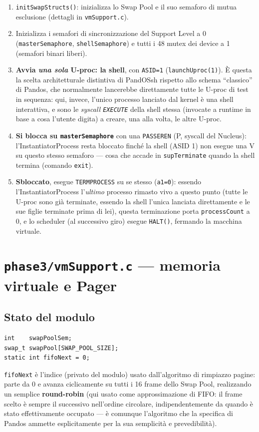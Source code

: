 \documentclass[11pt,a4paper]{article}
\newcommand{\code}[1]{\texttt{#1}}
\begin{document}
\begin{enumerate}
\item \code{initSwapStructs()}: inizializza lo Swap Pool e il suo semaforo
  di mutua esclusione (dettagli in \code{vmSupport.c}).
\item Inizializza i semafori di sincronizzazione del Support Level a 0
  (\code{masterSemaphore}, \code{shellSemaphore}) e tutti i 48 mutex dei
  device a 1 (semafori binari liberi).
\item \textbf{Avvia \emph{una sola} U-proc: la shell}, con \code{ASID=1}
  (\code{launchUproc(1)}). \`E questa la scelta architetturale distintiva
  di PandOSsh rispetto allo schema ``classico'' di Pandos, che normalmente
  lancerebbe direttamente tutte le U-proc di test in sequenza: qui, invece,
  l'unico processo lanciato dal kernel è una shell interattiva, e sono le
  \emph{syscall \code{EXECUTE}} della shell stessa (invocate a runtime in
  base a cosa l'utente digita) a creare, una alla volta, le altre U-proc.
\item \textbf{Si blocca su \code{masterSemaphore}} con una \code{PASSEREN}
  (P, syscall del Nucleus): l'InstantiatorProcess resta bloccato finché la
  shell (ASID 1) non esegue una V su questo stesso semaforo --- cosa che
  accade in \code{supTerminate} quando la shell termina (comando
  \code{exit}).
\item \textbf{Sbloccato}, esegue \code{TERMPROCESS} su se stesso
  (\code{a1=0}): essendo l'InstantiatorProcess l'\emph{ultimo} processo
  rimasto vivo a questo punto (tutte le U-proc sono già terminate, essendo
  la shell l'unica lanciata direttamente e le sue figlie terminate prima di
  lei), questa terminazione porta \code{processCount} a 0, e lo scheduler
  (al successivo giro) esegue \code{HALT()}, fermando la macchina virtuale.
\end{enumerate}

\section{\code{phase3/vmSupport.c} --- memoria virtuale e Pager}
\label{sec:vmsupport-fase3}

\subsection{Stato del modulo}
\begin{lstlisting}
int    swapPoolSem;
swap_t swapPool[SWAP_POOL_SIZE];
static int fifoNext = 0;
\end{lstlisting}
\code{fifoNext} è l'indice (privato del modulo) usato dall'algoritmo di
rimpiazzo pagine: parte da 0 e avanza ciclicamente su tutti i 16 frame dello
Swap Pool, realizzando un semplice \textbf{round-robin} (qui usato come
approssimazione di FIFO: il frame scelto è sempre il successivo nell'ordine
circolare, indipendentemente da quando è stato effettivamente occupato ---
è comunque l'algoritmo che la specifica di Pandos ammette esplicitamente
per la sua semplicità e prevedibilità).
\end{document}
